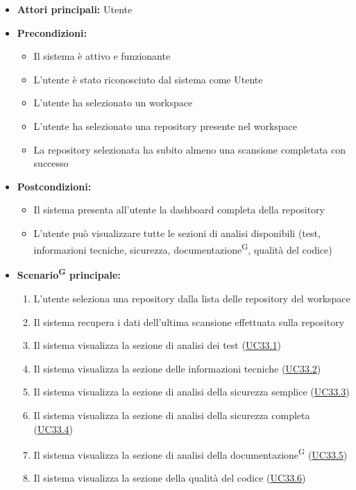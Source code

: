 \documentclass[a4paper, 11pt]{article}
\begin{document}
\begin{itemize}
    \item \textbf{Attori principali:} Utente
    \item \textbf{Precondizioni:}
    \begin{itemize}
        \item Il sistema è attivo e funzionante
        \item L'utente è stato riconosciuto dal sistema come Utente
        \item L'utente ha selezionato un workspace
        \item L'utente ha selezionato una repository presente nel workspace
        \item La repository selezionata ha subito almeno una scansione completata con successo
    \end{itemize}
    \item \textbf{Postcondizioni:}
    \begin{itemize}
        \item Il sistema presenta all'utente la dashboard completa della repository
        \item L'utente può visualizzare tutte le sezioni di analisi disponibili (test, informazioni tecniche, sicurezza, documentazione\textsuperscript{G}, qualità del codice)
    \end{itemize}
    \item \textbf{Scenario\textsuperscript{G} principale:}
    \begin{enumerate}
        \item L'utente seleziona una repository dalla lista delle repository del workspace
        \item Il sistema recupera i dati dell'ultima scansione effettuata sulla repository
        \item Il sistema visualizza la sezione di analisi dei test (\hyperref[UC33.1]{UC33.1})
        \item Il sistema visualizza la sezione delle informazioni tecniche (\hyperref[UC33.2]{UC33.2})
        \item Il sistema visualizza la sezione di analisi della sicurezza semplice (\hyperref[UC33.3]{UC33.3})
        \item Il sistema visualizza la sezione di analisi della sicurezza completa (\hyperref[UC33.4]{UC33.4})
        \item Il sistema visualizza la sezione di analisi della documentazione\textsuperscript{G} (\hyperref[UC33.5]{UC33.5})
        \item Il sistema visualizza la sezione della qualità del codice (\hyperref[UC33.6]{UC33.6})

\end{enumerate}
\end{itemize}
\end{document}
